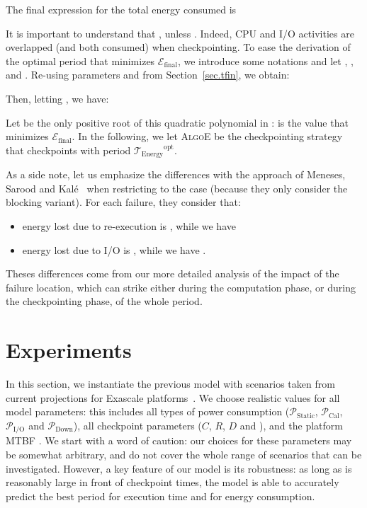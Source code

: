 \documentclass[a4paper]{article}
\newcommand{\ema}[1]{\ensuremath{#1}\xspace}
\newcommand{\ccc}{\ema{C}}
\newcommand{\rrr}{\ema{R}}
\newcommand{\ddd}{\ema{D}}
\renewcommand{\time}[1][]{\ema{\mathcal{T}_{\text{#1}}}}
\newcommand{\toptE}{\ema{\time[Energy]^{\text{opt}}}}
\newcommand{\power}[1][]{\ema{\mathcal{P}_{\text{#1}}}}
\newcommand{\pCal}{\power[Cal]}
\newcommand{\pIO}{\power[I/O]}
\newcommand{\pDown}{\power[Down]}
\newcommand{\pIdle}{\power[Static]}
\newcommand{\E}[1][]{\ema{\mathcal{E}_{\text{#1}}}}
\newcommand{\efin}{\E[final]}
\newcommand{\algoE}{\textsc{AlgoE}\xspace}
\begin{document}
\medskip
The final expression for the total energy consumed is


It is important to understand that , unless .
Indeed, CPU and I/O activities are overlapped (and both consumed) when checkpointing.
To ease the derivation  of the optimal period that minimizes \efin, we introduce some notations
and let  , , 
and .
Re-using parameters  and 
from Section~\ref{sec.tfin}, we obtain:




Then, letting , we have:



Let  be the only positive root of this quadratic polynomial in :   is 
the value that minimizes \efin.
In the following, we let \algoE be the checkpointing strategy that checkpoints with period \toptE.



As a side note, let us emphasize the differences with the approach of 
Meneses, Sarood and Kal\'e~\cite{Kale2012} when restricting to the case  
(because they only consider the blocking variant). For each failure, they
consider that:
\begin{itemize}
	\item energy lost due to re-execution is , while we have
  \item energy lost due to I/O is , while we have .
\end{itemize}
Theses differences come from our more detailed analysis of the impact of the failure location, which can strike
either during the computation phase, or during the checkpointing phase, of the whole period.


\smallskip
\section{Experiments}
\label{sec.experiments}

In this section, we instantiate the previous model with scenarios taken from current projections
for Exascale platforms~\cite{IESP-Exascale,DARPA,Shalf2011,Ferreira2011}. 
We choose realistic values for all model parameters:
this includes all types of power consumption (\pIdle, \pCal, \pIO and \pDown), all checkpoint parameters
(\ccc, \rrr, \ddd and ), and the platform MTBF .
We start with a word of caution: our choices for these parameters may be somewhat arbitrary, and 
do not cover the whole range of scenarios that can be investigated. 
However, a key feature of our model is its robustness: as long as
 is reasonably large in front of checkpoint times, the model is able to accurately predict the 
best period for execution time and for energy consumption.
\end{document}
